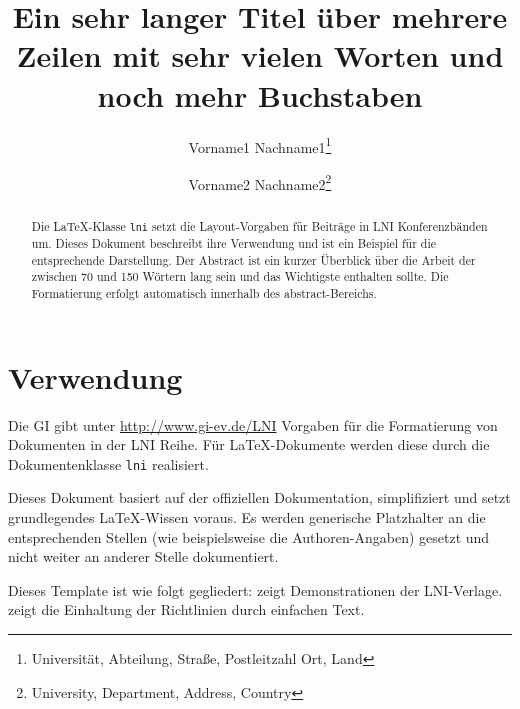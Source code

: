 \documentclass[utf8,biblatex]{lni}
\begin{document}
\title[Ein Kurztitel]{Ein sehr langer Titel über mehrere Zeilen mit sehr vielen Worten und noch mehr Buchstaben}
\author[Vorname1 Nachname1 \and Vorname2 Nachname2]
{Vorname1 Nachname1\footnote{Universität, Abteilung, Straße, Postleitzahl Ort, Land } \and
 Vorname2 Nachname2\footnote{University, Department, Address, Country }}
\maketitle

\begin{abstract}
Die \LaTeX-Klasse \texttt{lni} setzt die Layout-Vorgaben für Beiträge in LNI Konferenzbänden um.
Dieses Dokument beschreibt ihre Verwendung und ist ein Beispiel für die entsprechende Darstellung.
Der Abstract ist ein kurzer Überblick über die Arbeit der zwischen 70 und 150 Wörtern lang sein und das Wichtigste enthalten sollte.
Die Formatierung erfolgt automatisch innerhalb des abstract-Bereichs.
\end{abstract}


\section{Verwendung}
Die GI gibt unter \url{http://www.gi-ev.de/LNI} Vorgaben für die Formatierung von Dokumenten in der LNI Reihe.
Für \LaTeX-Dokumente werden diese durch die Dokumentenklasse \texttt{lni} realisiert.

Dieses Dokument basiert auf der offiziellen Dokumentation, simplifiziert und setzt grundlegendes LaTeX-Wissen voraus.
Es werden generische Platzhalter an die entsprechenden Stellen (wie beispielsweise die Authoren-Angaben) gesetzt und nicht weiter an anderer Stelle dokumentiert.

Dieses Template ist wie folgt gegliedert:
 zeigt Demonstrationen der LNI-Verlage.
 zeigt die Einhaltung der Richtlinien durch einfachen Text.
\end{document}
